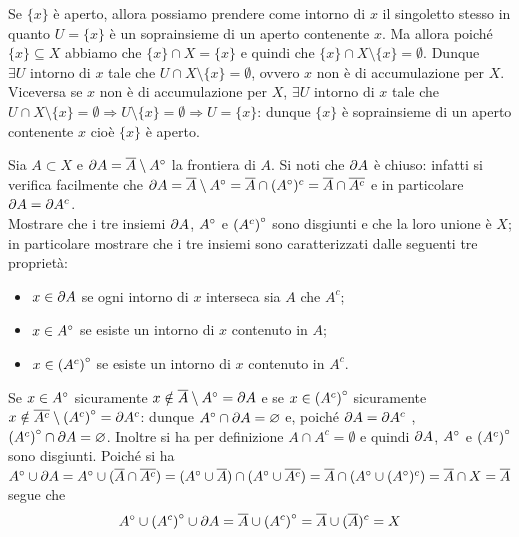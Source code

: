\documentclass[a4paper]{article}\par \usepackage{style}\par
\begin{document}
Se $ \{x\} $ è aperto, allora possiamo prendere come intorno di $ x $ il singoletto stesso in quanto $ U = \{x\} $ è un soprainsieme di un aperto contenente $ x $. Ma allora poiché $ \{x\} \subseteq X $ abbiamo che $ \{x\} \cap X = \{x\} $ e quindi che $ \{x\} \cap X \setminus \{x\} = \emptyset $. Dunque $ \exists U \text{ intorno di } x $ tale che $ U \cap X \setminus \{x\} = \emptyset $, ovvero $ x $ non è di accumulazione per $ X $. Viceversa se $ x $ non è di accumulazione per $ X $, $ \exists U \text{ intorno di } x $ tale che $ U \cap X \setminus \{x\} = \emptyset \Rightarrow U \setminus \{x\} = \emptyset \Rightarrow U = \{x\} $: dunque $ \{x\} $ è soprainsieme di un aperto contenente $ x $ cioè $ \{x\} $ è aperto.\par \begin{es}
  Sia $ A \subset X $ e $ \partial{A} = \overline{A} \setminus {A}^{\circ} $ la frontiera di $ A $. Si noti che $ \partial{A} $ è chiuso: infatti si verifica facilmente che $ \partial{A} = \overline{A} \setminus {A}^{\circ} = \overline{A} \cap ({A}^{\circ})^c = \overline{A} \cap \overline{A^c} $ e in particolare $ \partial{A} = \partial{A^c} $. \\
  Mostrare che i tre insiemi $ \partial{A} $, $ {A}^{\circ} $ e $ {(A^c)}^{\circ} $ sono disgiunti e che la loro unione è $ X $; in particolare mostrare che i tre insiemi sono caratterizzati dalle seguenti tre proprietà:
  \begin{itemize}
  \item $ x \in \partial{A} $ se ogni intorno di $ x $ interseca sia $ A $ che $ A^c $;
  \item $ x \in {A}^{\circ} $ se esiste un intorno di $ x $ contenuto in $ A $;
  \item $ x \in {(A^c)}^{\circ} $ se esiste un intorno di $ x $ contenuto in $ A^c $.
  \end{itemize}
\end{es}\par Se $ x \in {A}^{\circ} $ sicuramente $ x \notin \overline{A} \setminus {A}^{\circ} = \partial{A} $ e se $ x \in {(A^c)}^{\circ} $ sicuramente $ x \notin \overline{A^c} \setminus {(A^c)}^{\circ} = \partial{A^c} $: dunque $ {A}^{\circ} \cap \partial{A} = \varnothing $ e, poiché $ \partial{A} = \partial{A^c} $ , $ {(A^c)}^{\circ} \cap \partial{A} = \varnothing $. Inoltre si ha per definizione $ A \cap A^c  = \emptyset$ e quindi $ \partial{A} $, $ {A}^{\circ} $ e $ {(A^c)}^{\circ} $ sono disgiunti. Poiché si ha $ {A}^{\circ} \cup \partial{A} = {A}^{\circ} \cup (\overline{A} \cap \overline{A^c}) = ({A}^{\circ} \cup \overline{A}) \cap ({A}^{\circ} \cup \overline{A^c}) = \overline{A} \cap ({A}^{\circ} \cup ({A}^{\circ})^c) = \overline{A} \cap X = \overline{A} $ segue che
\[{A}^{\circ} \cup {(A^c)}^{\circ} \cup \partial{A} = \overline{A} \cup {(A^c)}^{\circ} = \overline{A} \cup (\overline{A})^c = X\]
\end{document}
